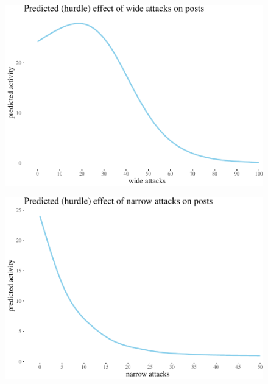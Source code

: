 \documentclass[a4paper,fleqn]{cas-dc}
\begin{document}
\begin{figure}
\centering

\begin{center}\includegraphics[width=0.85\linewidth]{images/unnamed-chunk-48-1} \end{center}
\end{figure}

\begin{figure}
\centering

\begin{center}\includegraphics[width=0.85\linewidth]{images/unnamed-chunk-49-1} \end{center}
\end{figure}
\end{document}
